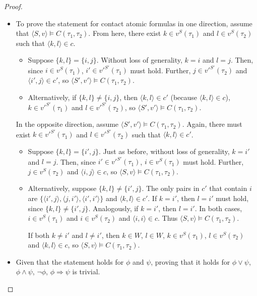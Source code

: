 \documentclass{article}
\newcommand{\lcont}{C}
\begin{document}
\begin{proof}
\begin{itemize}
\begin{itemize}
    \end{itemize}
  \item To prove the statement for contact atomic formulas in one direction, assume that $\langle S, v \rangle \models \lcont(\tau_1, \tau_2)$. From here, there exist $k \in v^S(\tau_1)$ and $l \in v^S(\tau_2)$ such that $\langle k, l \rangle \in c$.
    \begin{itemize}
    \item Suppose $\{k, l\} = \{i, j\}$. Without loss of generality, $k = i$ and $l = j$. Then, since $i \in v^S(\tau_1)$, $i' \in v'^{S'}(\tau_1)$ must hold. Further, $j \in v'^{S'}(\tau_2)$ and $\langle i', j \rangle \in c'$, so $\langle S', v' \rangle \models \lcont(\tau_1, \tau_2)$.
    \item Alternatively, if $\{k, l\} \neq \{i, j\}$, then $\langle k, l \rangle \in c'$ (because $\langle k, l \rangle \in c$), $k \in v'^{S'}(\tau_1)$ and $l \in v'^{S'}(\tau_2)$, so $\langle S', v' \rangle \models \lcont(\tau_1, \tau_2)$.
    \end{itemize}
    In the opposite direction, assume $\langle S', v' \rangle \models \lcont(\tau_1, \tau_2)$. Again, there must exist $k \in v'^{S'}(\tau_1)$ and $l \in v'^{S'}(\tau_2)$ such that $\langle k, l \rangle \in c'$.
    \begin{itemize}
    \item Suppose $\{k, l\} = \{i', j\}$. Just as before, without loss of generality, $k = i'$ and $l = j$. Then, since $i' \in v'^{S'}(\tau_1)$, $i \in v^S(\tau_1)$ must hold. Further, $j \in v^S(\tau_2)$ and $\langle i, j \rangle \in c$, so $\langle S, v \rangle \models \lcont(\tau_1, \tau_2)$.
    \item
      Alternatively, suppose $\{k, l\} \neq \{i', j\}$. The only pairs in $c'$ that contain $i$ are $\{\langle i', j \rangle, \langle j, i' \rangle, \langle i', i' \rangle\}$ and $\langle k, l \rangle \in c'$. If $k = i'$, then $l = i'$ must hold, since $\{k, l\} \neq \{i', j\}$. Analogously, if $k = i'$, then $l = i'$. In both cases, $i \in v^S(\tau_1)$ and $i \in v^S(\tau_2)$ and $\langle i, i \rangle \in c$. Thus $\langle S, v \rangle \models \lcont(\tau_1, \tau_2)$.

      If both $k \neq i'$ and $l \neq i'$, then $k \in W$, $l \in W$, $k \in v^S(\tau_1)$, $l \in v^S(\tau_2)$ and $\langle k, l \rangle \in c$, so $\langle S, v \rangle \models \lcont(\tau_1, \tau_2)$.
    \end{itemize}
    \item Given that the statement holds for $\phi$ and $\psi$, proving that it holds for $\phi \lor \psi$, $\phi \land \psi$, $\lnot \phi$, $\phi \Rightarrow \psi$ is trivial.
\end{itemize}
\end{proof}
\end{document}

